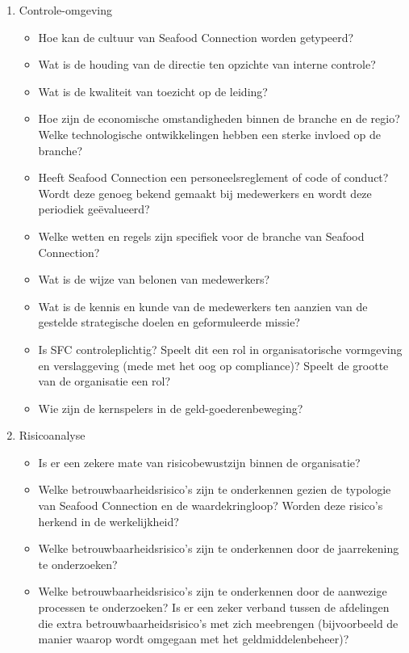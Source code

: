 \documentclass[10pt,a4paper,twoside]{report}
\begin{document}
\begin{enumerate}
    \item Controle-omgeving
        \begin{itemize}
            \item Hoe kan de cultuur van Seafood Connection worden getypeerd?
            \item Wat is de houding van de directie ten opzichte van interne controle?
            \item Wat is de kwaliteit van toezicht op de leiding?
            \item Hoe zijn de economische omstandigheden binnen de branche en de regio? Welke technologische ontwikkelingen hebben een sterke invloed op de branche?
            \item Heeft Seafood Connection een personeelsreglement of code of conduct? Wordt deze genoeg bekend gemaakt bij medewerkers en wordt deze periodiek geëvalueerd?
            \item Welke wetten en regels zijn specifiek voor de branche van Seafood Connection?
            \item Wat is de wijze van belonen van medewerkers?
            \item Wat is de kennis en kunde van de medewerkers ten aanzien van de gestelde strategische doelen en geformuleerde missie?
            \item Is SFC controleplichtig? Speelt dit een rol in organisatorische vormgeving en verslaggeving (mede met het oog op compliance)? Speelt de grootte van de organisatie een rol?
            \item Wie zijn de kernspelers in de geld-goederenbeweging?
        \end{itemize}
    \item Risicoanalyse
        \begin{itemize}
            \item Is er een zekere mate van risicobewustzijn binnen de organisatie?
            \item Welke betrouwbaarheidsrisico's zijn te onderkennen gezien de typologie van Seafood Connection en de waardekringloop? Worden deze risico's herkend in de werkelijkheid?
            \item Welke betrouwbaarheidsrisico's zijn te onderkennen door de jaarrekening te onderzoeken?
            \item Welke betrouwbaarheidsrisico's zijn te onderkennen door de aanwezige processen te onderzoeken? Is er een zeker verband tussen de afdelingen die extra betrouwbaarheidsrisico's met zich meebrengen (bijvoorbeeld de manier waarop wordt omgegaan met het geldmiddelenbeheer)?

\end{itemize}
\end{enumerate}
\end{document}
